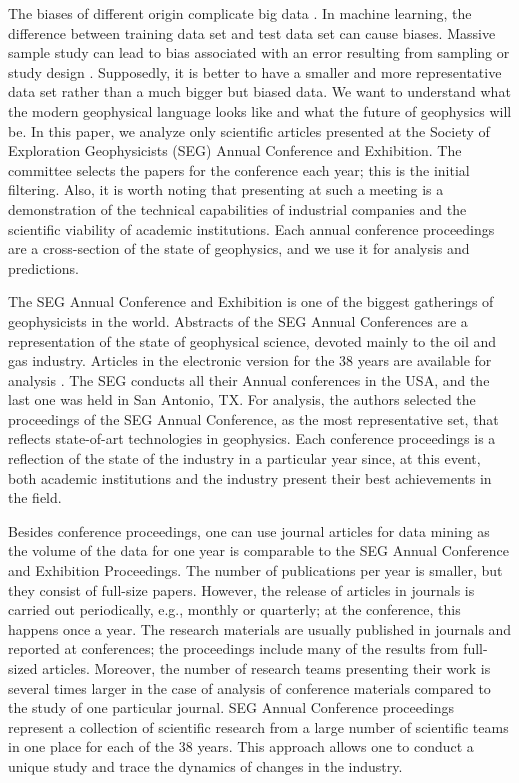\documentclass[geosciences,article,submit,moreauthors,pdftex]{Definitions/mdpi}
\begin{document}
The biases of different origin complicate big data \citep{Glauner2018}. In machine learning, the difference between training data set and test data set can cause biases. Massive sample study can lead to bias associated with an error resulting from sampling or study design \citep{Kaplan2014}. Supposedly, it is better to have a smaller and more representative data set rather than a much bigger but biased data. We want to understand what the modern geophysical language looks like and what the future of geophysics will be. In this paper, we analyze only scientific articles presented at the Society of Exploration Geophysicists (SEG) Annual Conference and Exhibition. The committee selects the papers for the conference each year; this is the initial filtering. Also, it is worth noting that presenting at such a meeting is a demonstration of the technical capabilities of industrial companies and the scientific viability of academic institutions. Each annual conference proceedings are a cross-section of the state of geophysics, and we use it for analysis and predictions.

The SEG Annual Conference and Exhibition is one of the biggest gatherings of geophysicists in the world. Abstracts of the SEG Annual Conferences are a representation of the state of geophysical science, devoted mainly to the oil and gas industry. Articles in the electronic version for the 38 years are available for analysis \citep{SEG}. The SEG conducts all their Annual conferences in the USA, and the last one was held in San Antonio, TX. For analysis, the authors selected the proceedings of the SEG Annual Conference, as the most representative set, that reflects state-of-art technologies in geophysics. Each conference proceedings is a reflection of the state of the industry in a particular year since, at this event, both academic institutions and the industry present their best achievements in the field.

Besides conference proceedings, one can use journal articles for data mining as the volume of the data for one year is comparable to the SEG Annual Conference and Exhibition Proceedings. The number of publications per year is smaller, but they consist of full-size papers. However, the release of articles in journals is carried out periodically, e.g., monthly or quarterly; at the conference, this happens once a year. The research materials are usually published in journals and reported at conferences; the proceedings include many of the results from full-sized articles. Moreover, the number of research teams presenting their work is several times larger in the case of analysis of conference materials compared to the study of one particular journal. SEG Annual Conference proceedings represent a collection of scientific research from a large number of scientific teams in one place for each of the 38 years. This approach allows one to conduct a unique study and trace the dynamics of changes in the industry.
\end{document}
